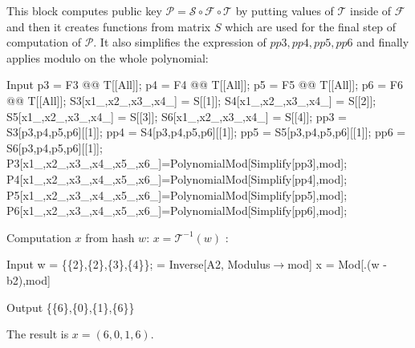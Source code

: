 \documentclass[thesis=M,english]{FITthesis}[2019/12/23]
\begin{document}
\noindent
This block computes public key $\mathcal{P} = \mathcal{S} \circ \mathcal{F} \circ \mathcal{T}$ by putting values of $\mathcal{T}$ inside of $\mathcal{F}$ and then it creates functions from matrix $S$ which are used for the final step of computation of $\mathcal{P}$. It also simplifies the expression of $pp3,pp4,pp5,pp6$ and finally applies modulo on the whole polynomial:
\begin{mmaCell}[moredefined={p3, p4, p5, p6, S3, S4, S5, S6, mod, P3, P4, P5, P6, pp3,pp4,pp5,pp6, F3, F4, F5,F6, T, S},morepattern={x1_, x2_, x3_, x4_, x5_, x6_},leftmargin=1.5em]{Input}
p3 = F3 @@ T[[All]];
p4 = F4 @@ T[[All]];
p5 = F5 @@ T[[All]];
p6 = F6 @@ T[[All]];
S3[x1_,x2_,x3_,x4_] = S[[1]];
S4[x1_,x2_,x3_,x4_] = S[[2]];
S5[x1_,x2_,x3_,x4_] = S[[3]];
S6[x1_,x2_,x3_,x4_] = S[[4]];
pp3 = S3[p3,p4,p5,p6][[1]];
pp4 = S4[p3,p4,p5,p6][[1]];
pp5 = S5[p3,p4,p5,p6][[1]];
pp6 = S6[p3,p4,p5,p6][[1]];
P3[x1_,x2_,x3_,x4_,x5_,x6_]=PolynomialMod[Simplify[pp3],mod];
P4[x1_,x2_,x3_,x4_,x5_,x6_]=PolynomialMod[Simplify[pp4],mod];
P5[x1_,x2_,x3_,x4_,x5_,x6_]=PolynomialMod[Simplify[pp5],mod];
P6[x1_,x2_,x3_,x4_,x5_,x6_]=PolynomialMod[Simplify[pp6],mod];
\end{mmaCell}

\noindent
Computation $x$ from hash $w$: $x = \mathcal{T}^{-1}(w)$ :
\begin{mmaCell}[moredefined={w, A2, b2, S, x, mod}]{Input}
w = \{\{2\},\{2\},\{3\},\{4\}\};
 = Inverse[A2, Modulus\(\pmb{\to}\)mod]
x = Mod[.(w - b2),mod]
\end{mmaCell}
\begin{mmaCell}{Output}
\{\{6\},\{0\},\{1\},\{6\}\}
\end{mmaCell}

\noindent
The result is $x = (6,0,1,6)$.
\end{document}
